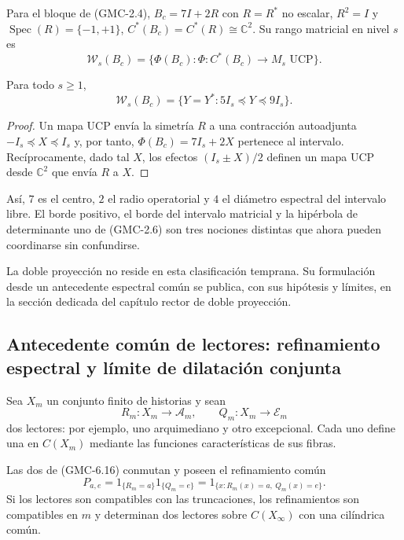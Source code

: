 Para el bloque de \textup{(GMC-2.4)},
$B_c=7I+2R$ con $R=R^*$ no escalar, $R^2=I$ y
$\operatorname{Spec}(R)=\{-1,+1\}$,
$C^*(B_c)=C^*(R)\cong\mathbb C^2$. Su rango matricial en nivel $s$ es
\[
 \mathcal W_s(B_c)=
 \{\Phi(B_c):\Phi:C^*(B_c)\to M_s\text{ UCP}\}.
\]

\begin{theorem}
\label{p12-83-c22-s1:gmc:thm:intervalo-bc}
Para todo $s\ge1$,
\[
 \boxed{\ 
 \mathcal W_s(B_c)
 =\{Y=Y^*:5I_s\preceq Y\preceq9I_s\}.
 \ }
 \tag{GMC-6.15}
\]
\end{theorem}

\begin{proof}
Un mapa UCP envía la simetría $R$ a una contracción autoadjunta
$-I_s\preceq X\preceq I_s$ y, por tanto,
$\Phi(B_c)=7I_s+2X$ pertenece al intervalo. Recíprocamente, dado tal $X$,
los efectos $(I_s\pm X)/2$ definen un mapa UCP desde $\mathbb C^2$ que envía
$R$ a $X$.
\end{proof}

Así, $7$ es el centro, $2$ el radio operatorial y $4$ el diámetro espectral
del intervalo libre. El borde positivo, el borde del intervalo matricial y la
hipérbola de determinante uno de \textup{(GMC-2.6)} son tres nociones distintas que
ahora pueden coordinarse sin confundirse.

La doble proyección no reside en esta clasificación temprana. Su formulación
desde un antecedente espectral común se publica, con sus hipótesis y límites,
en la sección dedicada del capítulo rector de doble proyección.
\fi

\ifdefined\HMTGMCDoubleProjection
\subsection{Antecedente común de lectores: refinamiento espectral y límite de
dilatación conjunta}

Sea $X_m$ un conjunto finito de historias y sean
\[
 R_m:X_m\to\mathcal A_m,
 \qquad
 Q_m:X_m\to\mathcal E_m
 \tag{GMC-6.16}
\]
dos lectores: por ejemplo, uno arquimediano y otro excepcional. Cada uno
define una \PVM en $C(X_m)$ mediante las funciones características de sus
fibras.

\begin{proposition}
\label{p12-83-c22-s1:gmc:prop:doble-proyeccion-conmutativa}
Las dos \PVM de \textup{(GMC-6.16)} conmutan y poseen el refinamiento común
\[
 P_{a,e}=1_{\{R_m=a\}}1_{\{Q_m=e\}}
 =1_{\{x:R_m(x)=a,\ Q_m(x)=e\}}.
 \tag{GMC-6.17}
\]
Si los lectores son compatibles con las truncaciones, los refinamientos son
compatibles en $m$ y determinan dos lectores sobre $C(X_\infty)$ con una
\PVM cilíndrica común.
\end{proposition}

